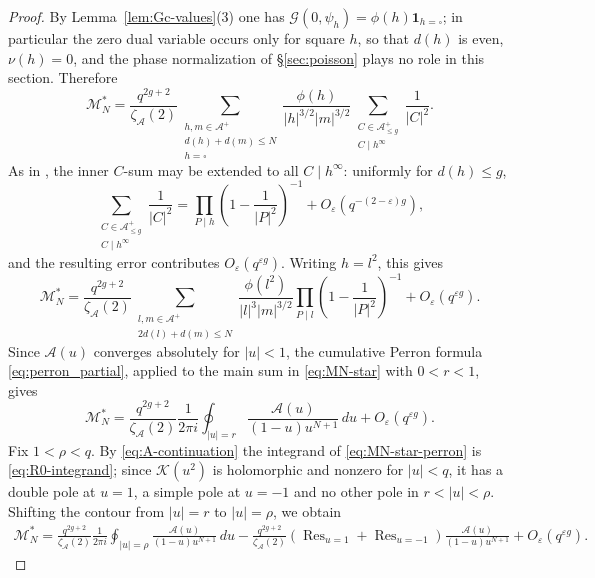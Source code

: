 \documentclass[a4paper,reqno]{amsart}
\numberwithin{equation}{section}
\theoremstyle{remark}
\theoremstyle{definition}
\newcommand{\A}{\mathcal{A}}
\newcommand{\zA}{\zeta_{\A}}
\newcommand{\Gc}{\mathcal{G}}
\begin{document}
\begin{proof}
By Lemma~\ref{lem:Gc-values}(3) one has
$\Gc(0,\psi_h)=\phi(h)\mathbf 1_{h=\square}$; in particular the zero dual
variable occurs only for square $h$, so that $d(h)$ is even, $\nu(h)=0$, and
the phase normalization of \S\ref{sec:poisson} plays no role in this section.
Therefore
$$
\mathcal M_N^*
=\frac{q^{2g+2}}{\zA(2)}
\sum_{\substack{h,m\in\A^+\\ d(h)+d(m)\le N\\ h=\square}}
\frac{\phi(h)}{|h|^{3/2}|m|^{3/2}}
\sum_{\substack{C\in\A^+_{\le g}\\ C\mid h^\infty}}\frac{1}{|C|^2}.
$$
As in \cite[Section~5]{Fl17-1}, the inner $C$-sum may be extended to all
$C\mid h^\infty$: uniformly for $d(h)\le g$,
$$
\sum_{\substack{C\in\A^+_{\le g}\\ C\mid h^\infty}}\frac{1}{|C|^2}
=\prod_{P\mid h}\left(1-\frac{1}{|P|^2}\right)^{-1}
+O_\varepsilon\!\left(q^{-(2-\varepsilon)g}\right),
$$
and the resulting error contributes $O_\varepsilon(q^{\varepsilon g})$.
Writing $h=l^2$, this gives
\begin{equation}\label{eq:MN-star}
\mathcal M_N^*
=\frac{q^{2g+2}}{\zA(2)}\sum_{\substack{l,m\in\A^+\\2d(l)+d(m)\le N}}
\frac{\phi(l^2)}{|l|^3|m|^{3/2}}
\prod_{P\mid l}\left(1-\frac{1}{|P|^2}\right)^{-1}
+O_\varepsilon\!\left(q^{\varepsilon g}\right).
\end{equation}
Since $\mathcal A(u)$ converges absolutely for $|u|<1$, the cumulative
Perron formula \eqref{eq:perron_partial}, applied to the main sum in
\eqref{eq:MN-star} with $0<r<1$, gives
\begin{equation}\label{eq:MN-star-perron}
\mathcal M_N^*
=\frac{q^{2g+2}}{\zA(2)}\frac{1}{2\pi i}
\oint_{|u|=r}\frac{\mathcal A(u)}{(1-u)u^{N+1}}\,du
+O_\varepsilon\!\left(q^{\varepsilon g}\right).
\end{equation}
Fix $1<\rho<q$.  By \eqref{eq:A-continuation} the integrand of
\eqref{eq:MN-star-perron} is \eqref{eq:R0-integrand};
since $\mathcal K(u^2)$ is holomorphic and nonzero for $|u|<q$, it has a
double pole at $u=1$, a simple pole at $u=-1$ and no other pole in
$r<|u|<\rho$.  Shifting the contour from $|u|=r$ to $|u|=\rho$, we obtain
\begin{equation}\label{eq:MN-star-contour}
\begin{aligned}
\mathcal M_N^*
=
\frac{q^{2g+2}}{\zA(2)}
\frac{1}{2\pi i}
\oint_{|u|=\rho}
\frac{\mathcal A(u)}{(1-u)u^{N+1}}\,du
-
\frac{q^{2g+2}}{\zA(2)}
\left(
\operatorname{Res}_{u=1}
+
\operatorname{Res}_{u=-1}
\right)
\frac{\mathcal A(u)}{(1-u)u^{N+1}}
+
O_\varepsilon\!\left(q^{\varepsilon g}\right).
\end{aligned}
\end{equation}


\end{proof}
\end{document}
